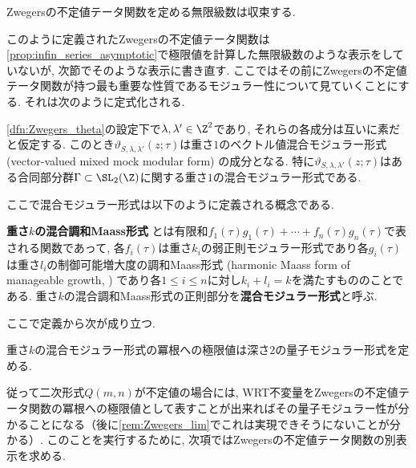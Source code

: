 \documentclass[11pt,b5paper,oneside,lualatex]{ltjsarticle} %
\numberwithin{equation}{section} %
\begin{document}
\begin{thm}
	Zwegersの不定値テータ関数を定める無限級数は収束する. 
\end{thm}

このように定義されたZwegersの不定値テータ関数は\cref{prop:infin_series_asymptotic}で極限値を計算した無限級数のような表示をしていないが, 次節でそのような表示に書き直す. 
ここではその前にZwegersの不定値テータ関数が持つ最も重要な性質であるモジュラー性について見ていくことにする. 
それは次のように定式化される. 

\begin{thm}
	\cref{dfn:Zwegers_theta}の設定下で$ \lambda, \lambda' \in \Z^2 $であり, それらの各成分は互いに素だと仮定する. 
	このとき$ \vartheta_{S, \lambda, \lambda'} \left( z; \tau \right) $は重さ$ 1 $のベクトル値混合モジュラー形式 (vector-valued mixed mock modular form) の成分となる. 
	特に$ \vartheta_{S, \lambda, \lambda'} \left( z; \tau \right) $はある合同部分群$ \Gamma \subset \SL_2(\Z) $に関する重さ$ 1 $の混合モジュラー形式である. 
\end{thm}

ここで混合モジュラー形式は以下のように定義される概念である. 

\begin{dfn}
	\textbf{重さ$ k $の混合調和Maass形式}%
	とは有限和$ f_1(\tau) g_1(\tau) + \cdots + f_n(\tau) g_n(\tau) $で表される関数であって, 各$ f_i(\tau) $は重さ$ k_i $の弱正則モジュラー形式であり各$ g_i(\tau) $は重さ$ l_i $の制御可能増大度の調和Maass形式 (harmonic Maass form of manageable growth, \cite[Definition 4.1]{BFOR}) であり各$ 1 \le i \le n $に対し$ k_i + l_i = k $を満たすもののことである. 
	重さ$ k $の混合調和Maass形式の正則部分を\textbf{混合モジュラー形式}と呼ぶ. 
\end{dfn}

ここで定義から次が成り立つ. 

\begin{lem}
	重さ$ k $の混合モジュラー形式の冪根への極限値は深さ$ 2 $の量子モジュラー形式を定める. 
\end{lem}

従って二次形式$ Q(m, n) $が不定値の場合には, WRT不変量をZwegersの不定値テータ関数の冪根への極限値として表すことが出来ればその量子モジュラー性が分かることになる（後に\cref{rem:Zwegers_lim}でこれは実現できそうにないことが分かる）. 
このことを実行するために, 次項ではZwegersの不定値テータ関数の別表示を求める. 
\end{document}
